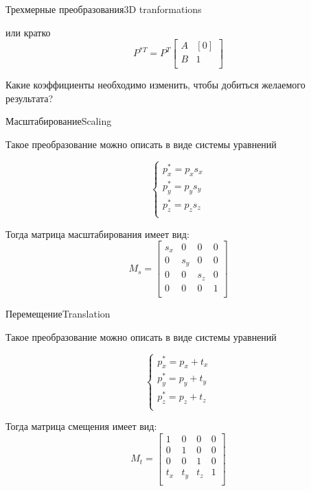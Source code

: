 \documentclass{beamer}
\begin{document}
\begin{frame}{Трехмерные преобразования}{3D tranformations}
{			или кратко
			\[
				P^{*T}
				=
				P^T
				\begin{bmatrix}
					A & [0]  \\
					B & 1 \\
				\end{bmatrix}
			\]
			
			Какие коэффициенты необходимо изменить, чтобы добиться желаемого результата?
		}
	\end{frame}

	\begin{frame}{Масштабирование}{Scaling}
		
		Такое преобразование можно описать в виде системы уравнений
		
		\[
			\begin{cases}
				p_x^{*} = p_x s_x \\
				p_y^{*} = p_y s_y \\
				p_z^{*} = p_z s_z \\
			\end{cases}
		\]

		Тогда матрица масштабирования имеет вид:
		\[
			M_s = 
			\begin{bmatrix}
				s_x & 0 & 0 & 0  \\
				0 & s_y & 0 & 0  \\
				0 & 0 & s_z & 0  \\
				0 & 0 & 0 & 1 \\
			\end{bmatrix}
		\]
		
	\end{frame}

	\begin{frame}{Перемещение}{Translation}
		
		Такое преобразование можно описать в виде системы уравнений
		
		\[
			\begin{cases}
				p_x^{*} = p_x + t_x \\
				p_y^{*} = p_y + t_y \\
				p_z^{*} = p_z + t_z \\
			\end{cases}
		\]

		Тогда матрица смещения имеет вид:
		\[
			M_t = 
			\begin{bmatrix}
				1 & 0 & 0 & 0  \\
				0 & 1 & 0 & 0  \\
				0 & 0 & 1 & 0  \\
				t_x & t_y & t_z & 1 \\
			\end{bmatrix}
		\]
		
		\note{}
	\end{frame}
\end{document}
